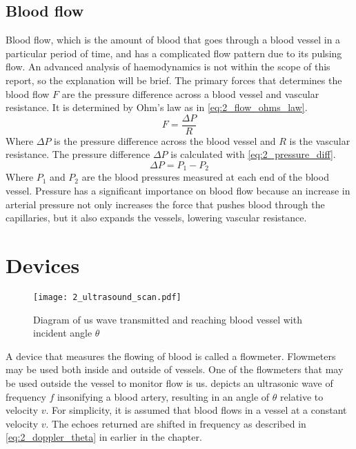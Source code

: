 \subsection{Blood flow}
Blood flow, which is the amount of blood that goes through a blood vessel in a particular period of time, and has a complicated flow pattern due to its pulsing flow. An advanced analysis of haemodynamics is not within the scope of this report, so the explanation will be brief. The primary forces that determines the blood flow $F$ are the pressure difference across a blood vessel and vascular resistance. It is determined by Ohm's law as in \cref{eq:2_flow_ohms_law}.
\begin{equation} \label{eq:2_flow_ohms_law}
	F = \frac{\Delta P}{R}
\end{equation}
Where $\Delta P$ is the pressure difference across the blood vessel and $R$ is the vascular resistance. The pressure difference $\Delta P$ is calculated with \cref{eq:2_pressure_diff}.
\begin{equation} \label{eq:2_pressure_diff}
	\Delta P = P_{1}-P_{2}
\end{equation}
Where $P_{1}$ and $P_{2}$ are the blood pressures measured at each end of the blood vessel. Pressure has a significant importance on blood flow because an increase in arterial pressure not only increases the force that pushes blood through the capillaries, but it also expands the vessels, lowering vascular resistance.

\section{Devices}
\begin{figure}[ht]
	\centering
	\texttt{[image: 2\_ultrasound\_scan.pdf]}
	\caption[Diagram of ultrasound wave transmitted and reaching blood vessel with incident angle $\theta$]{Diagram of \gls{us} wave transmitted and reaching blood vessel with incident angle $\theta$ \cite{ShungUltrasound_Book}}
	\label{fig:2_ultrasound_flow_scan}
\end{figure}

A device that measures the flowing of blood is called a flowmeter. Flowmeters may be used both inside and outside of vessels. One of the flowmeters that may be used outside the vessel to monitor flow is \gls{us}.  depicts an ultrasonic wave of frequency $f$ insonifying a blood artery, resulting in an angle of $\theta$ relative to velocity $v$. For simplicity, it is assumed that blood flows in a vessel at a constant velocity $v$. The echoes returned are shifted in frequency as described in \cref{eq:2_doppler_theta} in earlier in the chapter.

